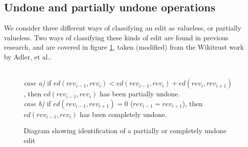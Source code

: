 
\subsection*{Undone and partially undone operations}
We consider three different ways of classifying an edit as valueless,
or partially valueless. Two ways of classifying these kinds of edit
are found in previous research, and are covered in figure
\ref{fig:undo}, taken (modified) from the Wikitrust
work by Adler, et al.\cite{Adler2007}.

\begin{figure}[h]
  \centering
  \\ 
  \vspace{10mm}
  \textit{case a)} if $ed(rev_{i-1},rev_i) < ed(rev_{i-1},rev_i) +
  ed(rev_{i},rev_{i+1})$, then $ed(rev_{i-1},rev_i)$ has been
  partially undone.\\
  \vspace{5mm}
  \textit{case b)} if $ed(rev_{i-1},rev_{i+1}) = 0$
  ($rev_{i-1} = rev_{i+1}$), then $ed(rev_{i-1},rev_i)$ has been
  completely undone.
  \caption{Diagram showing identification of a partially or
    completely undone edit}
  \label{fig:undo}
\end{figure}


